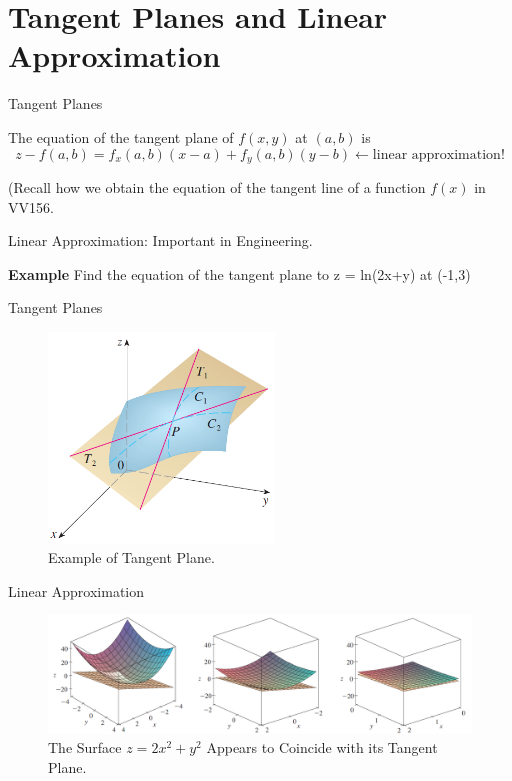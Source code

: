 \documentclass{beamer}
\begin{document}
\section{Tangent Planes and Linear Approximation}
    \begin{frame}[label=6]{Tangent Planes}
        \par The equation of the tangent plane of $f(x,y)$ at $(a,b)$ is 
        \begin{equation*}
            z - f(a,b) = f_x (a,b) (x-a) + f_y (a,b) (y-b) \leftarrow \text{linear approximation!}
        \end{equation*}
        \phantom{zjy}

        \par (Recall how we obtain the equation of the tangent line of a function $f(x)$ in VV156.
        
        \phantom{zjy}
    
        \par Linear Approximation: Important in Engineering.\\
        \par \textbf{Example} Find the equation of the tangent plane to z = ln(2x+y) at (-1,3)
    \end{frame}

    \begin{frame}{Tangent Planes}
        \begin{figure}
            \includegraphics[width = 6cm]{f12}
            \caption{Example of Tangent Plane.}
        \end{figure}
    \end{frame}

    \begin{frame}{Linear Approximation}
        \begin{figure}
            \includegraphics[width = 13cm]{f13}
            \caption{The Surface $z = 2x^2+y^2$ Appears to Coincide with its Tangent Plane.}
        \end{figure}
    \end{frame}
\end{document}
